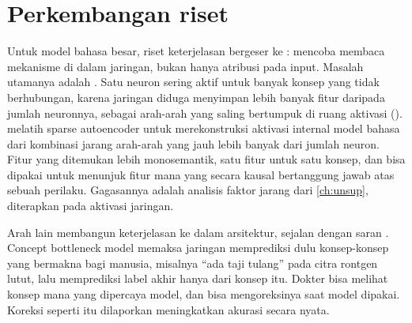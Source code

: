 \section{Perkembangan riset}

Untuk model bahasa besar, riset keterjelasan bergeser ke : mencoba membaca
mekanisme di dalam jaringan, bukan hanya atribusi pada input. Masalah utamanya adalah . Satu
neuron sering aktif untuk banyak konsep yang tidak berhubungan, karena jaringan diduga menyimpan lebih banyak fitur
daripada jumlah neuronnya, sebagai arah-arah yang saling bertumpuk di ruang aktivasi ().
\citet{cunningham2023} melatih sparse autoencoder untuk merekonstruksi aktivasi internal model bahasa dari kombinasi
jarang arah-arah yang jauh lebih banyak dari jumlah neuron. Fitur yang ditemukan lebih monosemantik, satu fitur untuk
satu konsep, dan bisa dipakai untuk menunjuk fitur mana yang secara kausal bertanggung jawab atas sebuah perilaku.
Gagasannya adalah analisis faktor jarang dari \cref{ch:unsup}, diterapkan pada aktivasi jaringan.

Arah lain membangun keterjelasan ke dalam arsitektur, sejalan dengan saran \citet{rudin2019}. Concept bottleneck model
\citep{koh2020} memaksa jaringan memprediksi dulu konsep-konsep yang bermakna bagi manusia, misalnya ``ada taji tulang''
pada citra rontgen lutut, lalu memprediksi label akhir hanya dari konsep itu. Dokter bisa melihat konsep mana yang
dipercaya model, dan bisa mengoreksinya saat model dipakai. Koreksi seperti itu dilaporkan meningkatkan akurasi secara
nyata.

